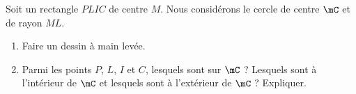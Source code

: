 
\begin{exercice}\label{exo2smath-0307}

    Soit un rectangle \( PLIC\) de centre \( M\). Nous considérons le cercle de centre \( \mC\) et de rayon \( ML\). 
    \begin{enumerate}
        \item
            Faire un dessin à main levée.
        \item
            Parmi les points \( P\), \( L\), \( I\) et \( C\), lesquels sont sur \( \mC\) ? Lesquels sont à l'intérieur de \( \mC\) et lesquels sont à l'extérieur de \( \mC\) ? Expliquer.
    \end{enumerate}

\end{exercice}

